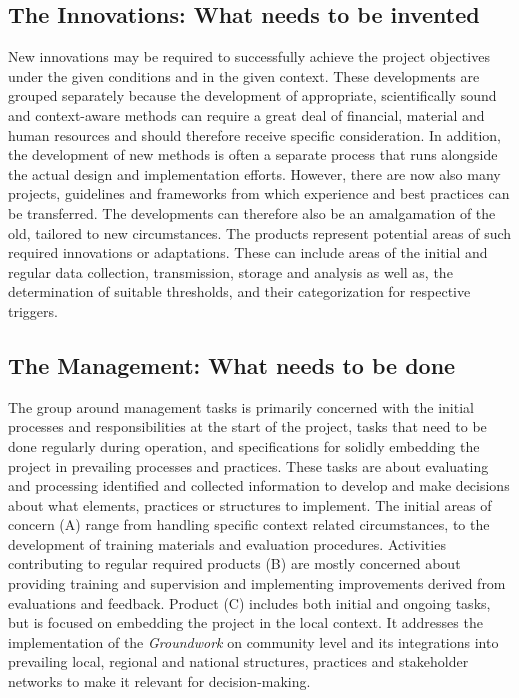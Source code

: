 
\subsection{The Innovations: What needs to be invented}
New innovations may be required to successfully achieve the project objectives under the given conditions and in the given context. These developments are grouped separately because the development of appropriate, scientifically sound and context-aware methods can require a great deal of financial, material and human resources and should therefore receive specific consideration. In addition, the development of new methods is often a separate process that runs alongside the actual design and implementation efforts. However, there are now also many projects, guidelines and frameworks from which experience and best practices can be transferred. The developments can therefore also be an amalgamation of the old, tailored to new circumstances.\newline
The products represent potential areas of such required innovations or adaptations. These can include areas of the initial and regular data collection, transmission, storage and analysis as well as, the determination of suitable thresholds, and their categorization for respective triggers.


\subsection{The Management: What needs to be done}
The group around management tasks is primarily concerned with the initial processes and responsibilities at the start of the project, tasks that need to be done regularly during operation, and specifications for solidly embedding the project in prevailing processes and practices. These tasks are about evaluating and processing identified and collected information to develop and make decisions about what elements, practices or structures to implement. The initial areas of concern (A) range from handling specific context related circumstances, to the development of training materials and evaluation procedures. Activities contributing to regular required products (B) are mostly concerned about providing training and supervision and implementing improvements derived from evaluations and feedback. Product (C) includes both initial and ongoing tasks, but is focused on embedding the project in the local context. It addresses the implementation of the \textit{Groundwork} on community level and its integrations into prevailing local, regional and national structures, practices and stakeholder networks to make it relevant for decision-making.

